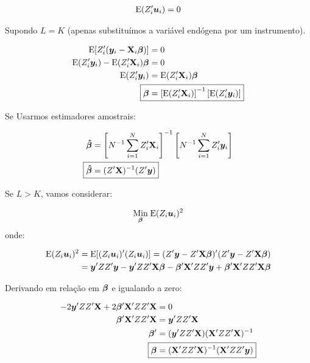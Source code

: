 \documentclass[11pt, oneside, a4paper, article]{article}
\numberwithin{equation}{section}
\begin{document}
\begin{description}
\vspace{-1 em}
\begin{align*}
\text{E}(Z_{i}^{\prime} \boldsymbol{u}_{i}) = 0
\end{align*}

Supondo $L = K$ (apenas substituímos a variável endógena por um instrumento).

\vspace{-1 em}
\begin{align*}
\E[ Z_{i}^{\prime} ( \yvec_{i} - \Xmat_{i} \betavec ) ] &= 0
\\
\E( Z_{i}^{\prime} \yvec_{i} ) - \E( Z_{i}^{\prime} \Xmat_{i} ) \betavec &= 0
\\
\E( Z_{i}^{\prime} \yvec_{i} ) &= \E( Z_{i}^{\prime} \Xmat_{i} ) \betavec
\\
\Aboxed{
\betavec &=
\left[ \E( Z_{i}^{\prime} \Xmat_{i} ) \right]^{-1}
\left[ \E( Z_{i}^{\prime} \yvec_{i} ) \right]
}
\end{align*}

Se Usarmos estimadores amostrais:

\vspace{-1 em}
\begin{align*}
\mbs{\hat{\beta}} &=
\left[ N^{-1} \sum_{i=1}^{N} Z_{i}^{\prime} \Xmat_{i} \right]^{-1}
\left[ N^{-1} \sum_{i=1}^{N} Z_{i}^{\prime} \yvec_{i} \right]
\\
\Aboxed{
\mbs{\hat{\beta}} &=
( Z^{\prime} \Xmat )^{-1} ( Z^{\prime} \yvec ) }
\end{align*}

\vspace{1 em}
Se $L > K$, vamos considerar:

\vspace{-1 em}
\begin{align*}
\underset{\boldsymbol{\beta}}{\text{Min}} \;
\text{E}( Z_{i}\boldsymbol{u}_{i} )^2
\end{align*}
\noindent onde:

\vspace{-1 em}
\begin{align*}
\text{E}( Z_{i}\boldsymbol{u}_{i} )^2 
&=
\text{E}[ ( Z_{i}\boldsymbol{u}_{i} )' ( Z_{i}\boldsymbol{u}_{i} ) ]
=
( Z' \boldsymbol{y} - Z' \mathbf{X} \boldsymbol{\beta} )' ( Z' \boldsymbol{y} - Z' \mathbf{X} \boldsymbol{\beta} )
\\
&=
\boldsymbol{y}' ZZ' \boldsymbol{y}
-
\boldsymbol{y}' ZZ' \mathbf{X} \boldsymbol{\beta}
-
\boldsymbol{\beta}' \mathbf{X}' ZZ' \boldsymbol{y}
+
\boldsymbol{\beta}' \mathbf{X}' ZZ' \mathbf{X} \boldsymbol{\beta}
\end{align*}

Derivando em relação em $\boldsymbol{\beta}$ e igualando a zero:

\vspace{-1 em}
\begin{align*}
-2 \yvec' ZZ' \Xmat + 2 \betavec'\Xmat' ZZ' \Xmat &= 0
\\
\betavec'\Xmat' ZZ' \Xmat &= \yvec' ZZ' \Xmat 
\\
\betavec' &= ( \yvec' ZZ' \Xmat ) ( \Xmat' ZZ' \Xmat )^{-1}
\\
\Aboxed{
\betavec &= ( \Xmat' ZZ' \Xmat )^{-1} ( \Xmat' ZZ' \yvec ) }
\end{align*}


\end{description}
\end{document}
